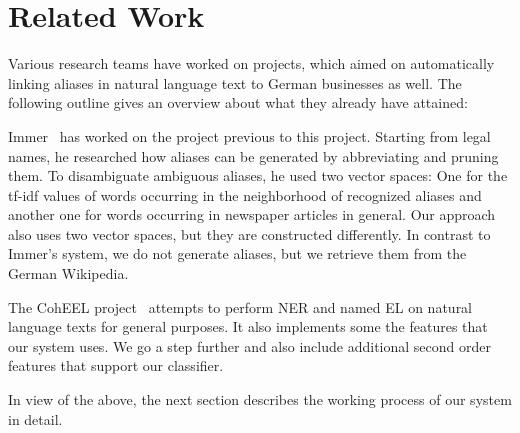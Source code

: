 \section{Related Work}
\label{sec:related_work}
Various research teams have worked on projects, which aimed on automatically linking aliases in natural language text to German businesses as well. The following outline gives an overview about what they already have attained:

Immer~\cite{immer} has worked on the project previous to this project. Starting from legal names, he researched how aliases can be generated by abbreviating and pruning them. To disambiguate ambiguous aliases, he used two vector spaces: One for the tf-idf values of words occurring in the neighborhood of recognized aliases and another one for words occurring in newspaper articles in general. Our approach also uses two vector spaces, but they are constructed differently. In contrast to Immer's system, we do not generate aliases, but we retrieve them from the German Wikipedia.

The CohEEL project~\cite{coheel} attempts to perform NER and named EL on natural language texts for general purposes. It also implements some the features that our system uses. We go a step further and also include additional second order features that support our classifier.

In view of the above, the next section describes the working process of our system in detail.

